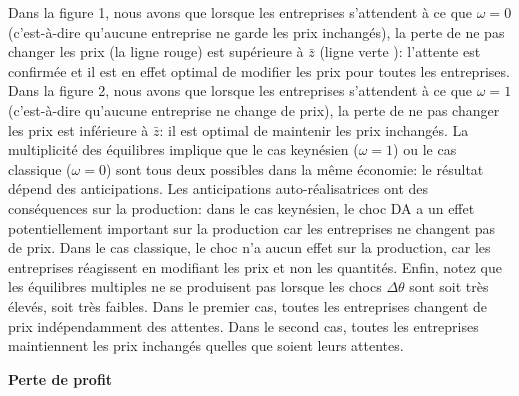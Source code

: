 \documentclass[11pt,a4paper]{article}
\begin{document}
Dans la figure 1, nous avons que lorsque les entreprises s'attendent à ce que $ \omega = 0 $ (c'est-à-dire qu'aucune entreprise ne garde les prix inchangés), la perte de ne pas changer les prix (la ligne rouge) est supérieure à $ \bar{z} $ (ligne verte ):   l'attente est confirmée et il est en effet optimal de modifier les prix pour toutes les entreprises. Dans la figure 2, nous avons que lorsque les entreprises s'attendent à ce que $ \omega = 1 $ (c'est-à-dire qu'aucune entreprise ne change de prix), la perte de ne pas changer les prix est inférieure à $ \bar{z} $: il est  optimal de maintenir les prix inchangés. La multiplicité des équilibres implique que le cas keynésien ($ \omega = 1 $) ou le cas classique ($ \omega = 0 $) sont tous deux possibles dans la même économie: le résultat dépend des anticipations. Les anticipations auto-réalisatrices ont des conséquences sur la production: dans le cas keynésien, le choc DA a un effet potentiellement important sur la production car les entreprises ne changent pas de prix. Dans le cas classique, le choc n'a aucun effet sur la production, car les entreprises réagissent en modifiant les prix et non les quantités. Enfin, notez que les équilibres multiples ne se produisent pas lorsque les chocs $ \Delta \theta $ sont soit très élevés, soit très faibles. Dans le premier cas, toutes les entreprises changent de prix indépendamment des attentes. Dans le second cas, toutes les entreprises maintiennent les prix inchangés quelles que soient leurs attentes.

\newpage

\bigskip

\textbf{Perte de profit}

\bigskip
\end{document}
